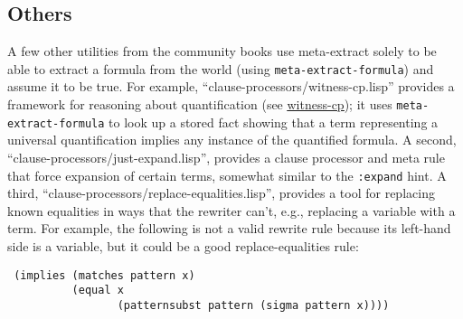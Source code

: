\subsection{Others}

A few other utilities from the community books use
meta-extract solely to be able to extract a formula from the world
(using \texttt{meta-extract-formula}) and assume it to be true.  For
example, ``clause-processors/witness-cp.lisp'' provides a framework
for reasoning about quantification (see
\href{http://www.cs.utexas.edu/users/moore/acl2/manuals/current/manual/index.html?topic=ACL2\_\_\_\_WITNESS-CP}{\underline{witness-cp}});
it uses \texttt{meta-extract-formula} to look up a stored fact showing
that a term representing a universal quantification implies any
instance of the quantified formula.  A second,
``clause-processors/just-expand.lisp'', provides a clause processor
and meta rule that force expansion of certain terms, somewhat similar
to the \texttt{:expand} hint.  A third,
``clause-processors/replace-equalities.lisp'', provides a tool for
replacing known equalities in ways that the
rewriter can't, e.g., replacing a variable with a term.  For example, the
following is not a valid rewrite rule because its left-hand side is a
variable, but it could be a good replace-equalities rule:
\begin{verbatim}
 (implies (matches pattern x)
          (equal x
                 (patternsubst pattern (sigma pattern x))))
\end{verbatim}


